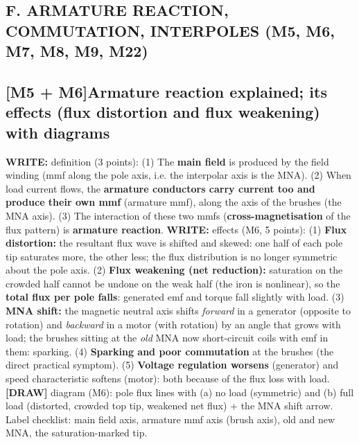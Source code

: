 \documentclass[11pt]{article}
\newcommand{\q}[2]{\subsection*{\color{copper}#1\quad\color{iron}#2}}
\newcommand{\w}[1]{\textbf{\color{copper}WRITE:} #1}
\newcommand{\dw}[1]{\textbf{\color{muted}[DRAW]} #1}
\begin{document}
\hrulefill
\subsection*{\color{copper}F. ARMATURE REACTION, COMMUTATION, INTERPOLES (M5, M6, M7, M8, M9, M22)}

\q{[M5 + M6]}{Armature reaction explained; its effects (flux distortion and flux weakening) with diagrams}
\w{definition (3 points):} (1) The \textbf{main field} is produced by the field winding (mmf along the pole axis, i.e. the interpolar axis is the MNA). (2) When load current flows, the \textbf{armature conductors carry current too and produce their own mmf} (armature mmf), along the axis of the brushes (the MNA axis). (3) The interaction of these two mmfs (\textbf{cross-magnetisation} of the flux pattern) is \textbf{armature reaction}.
\w{effects (M6, 5 points):} (1) \textbf{Flux distortion:} the resultant flux wave is shifted and skewed: one half of each pole tip saturates more, the other less; the flux distribution is no longer symmetric about the pole axis. (2) \textbf{Flux weakening (net reduction):} saturation on the crowded half cannot be undone on the weak half (the iron is nonlinear), so the \textbf{total flux per pole falls}: generated emf and torque fall slightly with load. (3) \textbf{MNA shift:} the magnetic neutral axis shifts \emph{forward} in a generator (opposite to rotation) and \emph{backward} in a motor (with rotation) by an angle that grows with load; the brushes sitting at the \emph{old} MNA now short-circuit coils with emf in them: sparking. (4) \textbf{Sparking and poor commutation} at the brushes (the direct practical symptom). (5) \textbf{Voltage regulation worsens} (generator) and speed characteristic softens (motor): both because of the flux loss with load.
\dw{diagram (M6): pole flux lines with (a) no load (symmetric) and (b) full load (distorted, crowded top tip, weakened net flux) + the MNA shift arrow. Label checklist: main field axis, armature mmf axis (brush axis), old and new MNA, the saturation-marked tip.}
\end{document}

